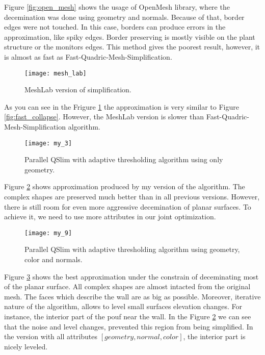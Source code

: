 Figure \ref{fig:open_mesh} shows the usage of OpenMesh library, where the decemination was done using geometry and normals. Because of that, border edges were not touched. In this case, borders can produce errors in the approximation, like spiky edges. Border preserving is mostly visible on the plant structure or the monitors edges. This method gives the poorest result, however, it is almost as fast as Fast-Quadric-Mesh-Simplification.

\begin{figure}[H]
  \begin{center}
    \texttt{[image: mesh\_lab]}
    \caption{MeshLab version of simplification.}
    \label{fig:mesh_lab}
  \end{center}
\end{figure}

As you can see in the Frigure \ref{fig:mesh_lab} the approximation is very similar to Figure \ref{fig:fast_collapse}. However, the MeshLab version is slower than Fast-Quadric-Mesh-Simplification algorithm.

\begin{figure}[H]
  \begin{center}
    \texttt{[image: my\_3]}
    \caption{Parallel QSlim with adaptive thresholding algorithm using only geometry.}
    \label{fig:my_3}
  \end{center}
\end{figure}

Figure \ref{fig:my_3} shows approximation produced by my version of the algorithm. The complex shapes are preserved much better than in all previous versions. However, there is still room for even more aggressive decemination of planar surfaces. To achieve it, we need to use more attributes in our joint optimization.

\begin{figure}[H]
  \begin{center}
    \texttt{[image: my\_9]}
    \caption{Parallel QSlim with adaptive thresholding algorithm using geometry, color and normals.}
    \label{fig:my_9}
  \end{center}
\end{figure}

Figure \ref{fig:my_9} shows the best approximation under the constrain of deceminating most of the planar surface. All complex shapes are almost intacted from the original mesh. The faces which describe the wall are as big as possible. Moreover, iterative nature of the algorithm, allows to level small surfaces elevation changes. For instance, the interior part of the pouf near the wall. In the Figure \ref{fig:my_3} we can see that the noise and level changes, prevented this region from being simplified. In the version with all attributes $[geometry, normal, color]$, the interior part is nicely leveled.

